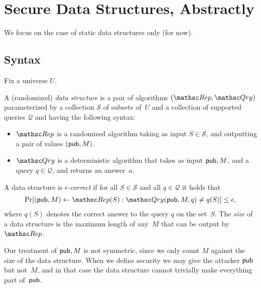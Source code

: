 \section{Secure Data Structures, Abstractly}
We focus on the case of static data structures only (for now).
\def\pub{{\sf pub}}

\subsection{Syntax}
Fix a universe $U$.

\begin{definition}
A (randomized) \emph{data structure} is a pair of algorithms $(\Rep, \Qry)$
parameterized by a collection $\mathcal{S}$ of subsets of~$U$ and a collection
of supported queries $\mathcal{Q}$ and having the following syntax:
\begin{itemize}
\item $\Rep$ is a randomized algorithm taking as input $S \in \mathcal{S}$,
and outputting a pair of values $(\pub, M)$.
\item $\Qry$ is a deterministic algorithm that takes as input $\pub, M$,
and a query $q\in \mathcal{Q}$, and returns an answer~$a$.
\end{itemize}
A data structure is \emph{$\epsilon$-correct} if for all $S \in \mathcal{S}$ and
all $q \in \mathcal{Q}$ it holds that
\begin{eqnarray}
\Pr[(\pub, M) \leftarrow \Rep(S) : \Qry(\pub, M, q) \neq q(S)] \leq \epsilon, \label{eqn:correctness}
\end{eqnarray}
where $q(S)$ denotes the correct answer to the query $q$ on the set~$S$.
The \emph{size} of a data structure is the maximum length of any~$M$ that can be
output by $\Rep$.
\end{definition}

Our treatment of $\pub, M$ is not symmetric, since we only count $M$ against the size
of the data structure. When we define security
we may give the attacker $\pub$ but not~$M$, and in that case the data structure cannot
trivially make everything part of~$\pub$.  

